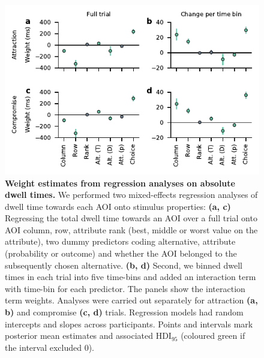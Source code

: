 \documentclass[11pt, a4paper]{article}
\begin{document}
\begin{refsection}
\begin{figure}
\includegraphics[scale=1]{../figures/S_dwell-regression_weights.pdf}
\caption{\textbf{Weight estimates from regression analyses on absolute dwell times.} We performed two mixed-effects regression analyses of dwell time towards each AOI onto stimulus properties: \textbf{(a, c)} Regressing the total dwell time towards an AOI over a full trial onto AOI column, row, attribute rank (best, middle or worst value on the attribute), two dummy predictors coding alternative, attribute (probability or outcome) and whether the AOI belonged to the subsequently chosen alternative. \textbf{(b, d)} Second, we binned dwell times in each trial into five time-bins and added an interaction term with time-bin for each predictor. The panels show the interaction term weights. Analyses were carried out separately for attraction \textbf{(a, b)} and compromise \textbf{(c, d)} trials. Regression models had random intercepts and slopes across participants. Points and intervals mark posterior mean estimates and associated HDI$_{95}$ (coloured green if the interval excluded 0).}
\label{fig:dwell-regression-weights}
\end{figure}


\end{refsection}
\end{document}
